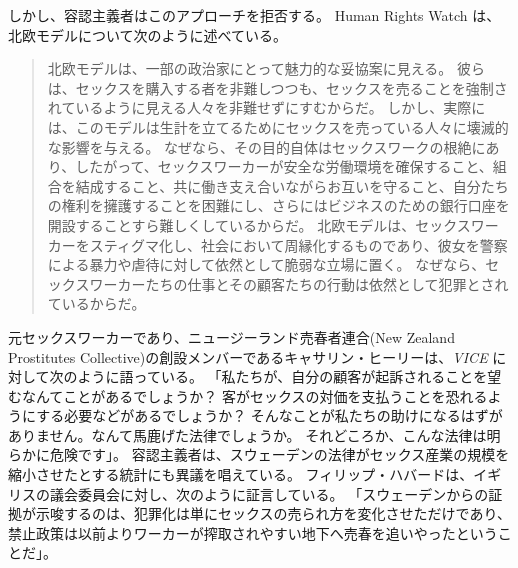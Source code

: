 \documentclass[paper=a4,book,openany]{jlreq}
\begin{document}
しかし、容認主義者はこのアプローチを拒否する。
Human Rights Watch は、北欧モデルについて次のように述べている。

\begin{quote}
北欧モデルは、一部の政治家にとって魅力的な妥協案に見える。
彼らは、セックスを購入する者を非難しつつも、セックスを売ることを強制されているように見える人々を非難せずにすむからだ。
しかし、実際には、このモデルは生計を立てるためにセックスを売っている人々に壊滅的な影響を与える。
なぜなら、その目的自体はセックスワークの根絶にあり、したがって、セックスワーカーが安全な労働環境を確保すること、組合を結成すること、共に働き支え合いながらお互いを守ること、自分たちの権利を擁護することを困難にし、さらにはビジネスのための銀行口座を開設することすら難しくしているからだ。
北欧モデルは、セックスワーカーをスティグマ化し、社会において周縁化するものであり、彼女を警察による暴力や虐待に対して依然として脆弱な立場に置く。
なぜなら、セックスワーカーたちの仕事とその顧客たちの行動は依然として犯罪とされているからだ。
\citep{watch19:_why_sex_work_shoul_be_decrim}
\end{quote}

元セックスワーカーであり、ニュージーランド売春者連合(New Zealand Prostitutes Collective)の創設メンバーであるキャサリン・ヒーリーは、\emph{VICE} に対して次のように語っている。
「私たちが、自分の顧客が起訴されることを望むなんてことがあるでしょうか？ 客がセックスの対価を支払うことを恐れるようにする必要などがあるでしょうか？ そんなことが私たちの助けになるはずがありません。なんて馬鹿げた法律でしょうか。
それどころか、こんな法律は明らかに危険です」\citep{mcclure17:_what_happen_when_sex_worker}。
容認主義者は、スウェーデンの法律がセックス産業の規模を縮小させたとする統計にも異議を唱えている。
フィリップ・ハバードは、イギリスの議会委員会に対し、次のように証言している。
「スウェーデンからの証拠が示唆するのは、犯罪化は単にセックスの売られ方を変化させただけであり、禁止政策は以前よりワーカーが搾取されやすい地下へ売春を追いやったということだ」\citep[p.25]{commons16:_prost}。
\end{document}
